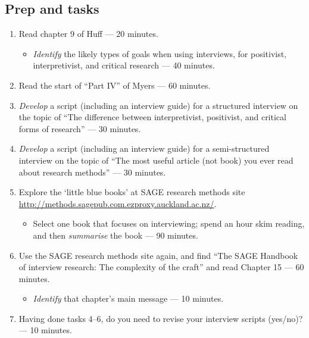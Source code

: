 \documentclass[]{book}
\providecommand{\tightlist}{%
  \setlength{\itemsep}{0pt}\setlength{\parskip}{0pt}}
\theoremstyle{definition}
\theoremstyle{definition}
\theoremstyle{definition}
\theoremstyle{remark}
\begin{document}
\hypertarget{prep-and-tasks-1}{%
\subsection*{Prep and tasks}\label{prep-and-tasks-1}}

\begin{enumerate}
\def\labelenumi{\arabic{enumi}.}
\item
  Read chapter 9 of Huff
  \autocite*{huff_2009_designingresearchpublication} --- 20 minutes.

  \begin{itemize}
  \tightlist
  \item
    \emph{Identify} the likely types of goals when using interviews, for
    positivist, interpretivist, and critical research --- 40 minutes.
  \end{itemize}
\item
  Read the start of ``Part IV'' of Myers \autocite*[
  p.~117--135]{myers_2013_qualitativeresearchbusiness} --- 60 minutes.
\item
  \emph{Develop} a script \autocite*[
  p.~129]{myers_2013_qualitativeresearchbusiness} (including an
  interview guide) for a structured interview on the topic of ``The
  difference between interpretivist, positivist, and critical forms of
  research'' --- 30 minutes.
\item
  \emph{Develop} a script (including an interview guide) for a
  semi-structured interview on the topic of ``The most useful article
  (not book) you ever read about research methods'' --- 30 minutes.
\item
  Explore the `little blue books' at SAGE research methods site
  \url{http://methods.sagepub.com.ezproxy.auckland.ac.nz/}.

  \begin{itemize}
  \tightlist
  \item
    Select one book that focuses on interviewing; spend an hour skim
    reading, and then \emph{summarise} the book --- 90 minutes.
  \end{itemize}
\item
  Use the SAGE research methods site again, and find ``The SAGE Handbook
  of interview research: The complexity of the craft'' and read Chapter
  15 \autocite{wang_2017_sagehandbookinterview} --- 60 minutes.

  \begin{itemize}
  \tightlist
  \item
    \emph{Identify} that chapter's main message --- 10 minutes.
  \end{itemize}
\item
  Having done tasks 4--6, do you need to revise your interview scripts
  (yes/no)? --- 10 minutes.
\end{enumerate}
\end{document}

